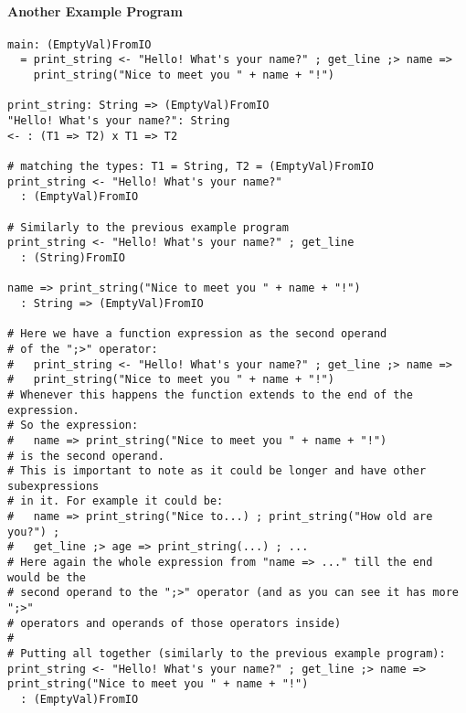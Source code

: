 \documentclass{article}
\begin{document}
\paragraph{Another Example Program}
\begin{verbatim}
main: (EmptyVal)FromIO
  = print_string <- "Hello! What's your name?" ; get_line ;> name =>
    print_string("Nice to meet you " + name + "!") 

print_string: String => (EmptyVal)FromIO
"Hello! What's your name?": String
<- : (T1 => T2) x T1 => T2

# matching the types: T1 = String, T2 = (EmptyVal)FromIO 
print_string <- "Hello! What's your name?"
  : (EmptyVal)FromIO

# Similarly to the previous example program
print_string <- "Hello! What's your name?" ; get_line
  : (String)FromIO

name => print_string("Nice to meet you " + name + "!") 
  : String => (EmptyVal)FromIO

# Here we have a function expression as the second operand
# of the ";>" operator:
#   print_string <- "Hello! What's your name?" ; get_line ;> name =>
#   print_string("Nice to meet you " + name + "!") 
# Whenever this happens the function extends to the end of the expression.
# So the expression:
#   name => print_string("Nice to meet you " + name + "!") 
# is the second operand.
# This is important to note as it could be longer and have other subexpressions
# in it. For example it could be:
#   name => print_string("Nice to...) ; print_string("How old are you?") ;
#   get_line ;> age => print_string(...) ; ...
# Here again the whole expression from "name => ..." till the end would be the
# second operand to the ";>" operator (and as you can see it has more ";>"
# operators and operands of those operators inside)
# 
# Putting all together (similarly to the previous example program):
print_string <- "Hello! What's your name?" ; get_line ;> name =>
print_string("Nice to meet you " + name + "!") 
  : (EmptyVal)FromIO
\end{verbatim}
\end{document}
